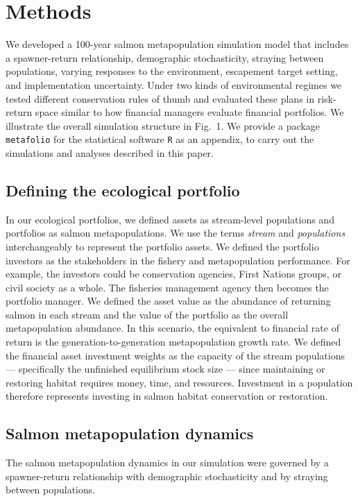 \section{Methods}

We developed a 100-year salmon metapopulation simulation model that includes a spawner-return relationship, demographic stochasticity, straying between populations, varying responses to the environment, escapement target setting, and implementation uncertainty. Under two kinds of environmental regimes we tested different conservation rules of thumb and evaluated these plans in risk-return space similar to how financial managers evaluate financial portfolios. We illustrate the overall simulation structure in Fig.~1. We provide a package \texttt{metafolio} for the statistical software \texttt{R} \citep{r2013} as an appendix, to carry out the simulations and analyses described in this paper.

\subsection{Defining the ecological portfolio}

In our ecological portfolios, we defined assets as stream-level populations and portfolios as salmon metapopulations. We use the terms \emph{stream} and \emph{populations} interchangeably to represent the portfolio assets. We defined the portfolio investors as the stakeholders in the fishery and metapopulation performance. For example, the investors could be conservation agencies, First Nations groups, or civil society as a whole. The fisheries management agency then becomes the portfolio manager. We defined the asset value as the abundance of returning salmon in each stream and the value of the portfolio as the overall metapopulation abundance. In this scenario, the equivalent to financial rate of return is the generation-to-generation metapopulation growth rate. We defined the financial asset investment weights as the capacity of the stream populations --- specifically the unfinished equilibrium stock size --- since maintaining or restoring habitat requires money, time, and resources. Investment in a population therefore represents investing in salmon habitat conservation or restoration.

\subsection{Salmon metapopulation dynamics}

The salmon metapopulation dynamics in our simulation were governed by a spawner-return relationship with demographic stochasticity and by straying between populations.

